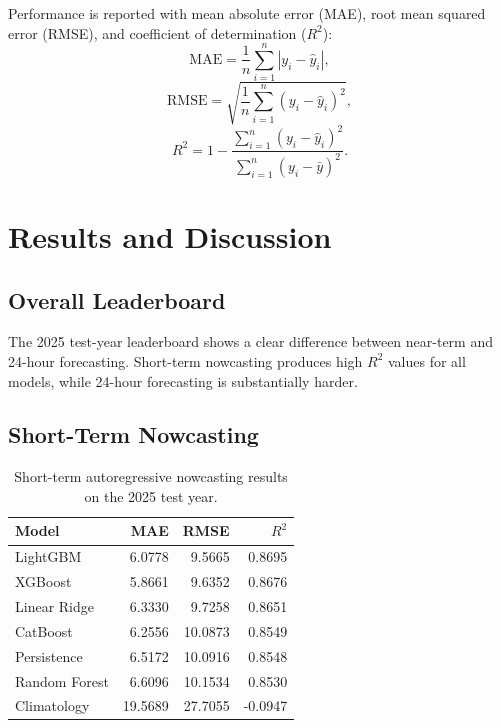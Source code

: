 \documentclass[11pt,a4paper]{article}
\begin{document}
Performance is reported with mean absolute error (MAE), root mean squared error (RMSE), and coefficient of determination ($R^2$):
\begin{equation}
    \mathrm{MAE}=\frac{1}{n}\sum_{i=1}^{n}|y_i-\hat{y}_i|,
    \label{eq:mae}
\end{equation}
\begin{equation}
    \mathrm{RMSE}=\sqrt{\frac{1}{n}\sum_{i=1}^{n}(y_i-\hat{y}_i)^2},
    \label{eq:rmse}
\end{equation}
\begin{equation}
    R^2=1-\frac{\sum_{i=1}^{n}(y_i-\hat{y}_i)^2}{\sum_{i=1}^{n}(y_i-\bar{y})^2}.
    \label{eq:r2}
\end{equation}

\section{Results and Discussion}
\subsection{Overall Leaderboard}
The 2025 test-year leaderboard shows a clear difference between near-term and 24-hour forecasting. Short-term nowcasting produces high $R^2$ values for all models, while 24-hour forecasting is substantially harder.

\subsection{Short-Term Nowcasting}
\begin{table}[H]
\centering
\caption{Short-term autoregressive nowcasting results on the 2025 test year.}
\label{tab:short-results}
\begin{tabular}{lrrr}
\toprule
Model & MAE & RMSE & $R^2$ \\
\midrule
LightGBM & 6.0778 & 9.5665 & 0.8695 \\
XGBoost & 5.8661 & 9.6352 & 0.8676 \\
Linear Ridge & 6.3330 & 9.7258 & 0.8651 \\
CatBoost & 6.2556 & 10.0873 & 0.8549 \\
Persistence & 6.5172 & 10.0916 & 0.8548 \\
Random Forest & 6.6096 & 10.1534 & 0.8530 \\
Climatology & 19.5689 & 27.7055 & -0.0947 \\
\bottomrule
\end{tabular}
\end{table}
\FloatBarrier
\end{document}
